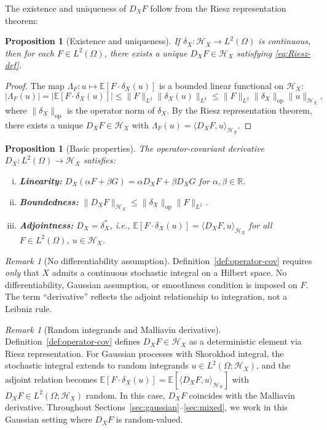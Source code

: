\documentclass[11pt,a4paper]{article}
\theoremstyle{plain}
\newtheorem{proposition}[theorem]{Proposition}
\theoremstyle{definition}
\theoremstyle{remark}
\newtheorem{remark}[theorem]{Remark}
\newcommand{\R}{\mathbb{R}}
\newcommand{\E}{\mathbb{E}}
\newcommand{\ip}[2]{\langle #1, #2 \rangle}
\newcommand{\norm}[1]{\| #1 \|}
\newcommand{\Lp}[1]{L^{#1}}
\newcommand{\HX}{\mathcal{H}_X}
\begin{document}
The existence and uniqueness of $D_X F$ follow from the Riesz representation theorem:

\begin{proposition}[Existence and uniqueness]\label{prop:riesz}
If $\delta_X: \HX \to \Lp{2}(\Omega)$ is continuous, then for each $F \in \Lp{2}(\Omega)$, there exists a unique $D_X F \in \HX$ satisfying \eqref{eq:Riesz-def}.
\end{proposition}

\begin{proof}
The map $\Lambda_F: u \mapsto \E[F \cdot \delta_X(u)]$ is a bounded linear functional on $\HX$:
\[
|\Lambda_F(u)| = |\E[F \cdot \delta_X(u)]| \leq \norm{F}_{\Lp{2}} \norm{\delta_X(u)}_{\Lp{2}} \leq \norm{F}_{\Lp{2}} \norm{\delta_X}_{\mathrm{op}} \norm{u}_{\HX},
\]
where $\norm{\delta_X}_{\mathrm{op}}$ is the operator norm of $\delta_X$. By the Riesz representation theorem, there exists a unique $D_X F \in \HX$ with $\Lambda_F(u) = \ip{D_X F}{u}_{\HX}$.
\end{proof}

\begin{proposition}[Basic properties]\label{prop:DX-props}
The operator-covariant derivative $D_X: \Lp{2}(\Omega) \to \HX$ satisfies:
\begin{enumerate}[(i)]
\item \textbf{Linearity:} $D_X(\alpha F + \beta G) = \alpha D_X F + \beta D_X G$ for $\alpha, \beta \in \R$.
\item \textbf{Boundedness:} $\norm{D_X F}_{\HX} \leq \norm{\delta_X}_{\mathrm{op}} \norm{F}_{\Lp{2}}$.
\item \textbf{Adjointness:} $D_X = \delta_X^*$, i.e., $\E[F \cdot \delta_X(u)] = \ip{D_X F}{u}_{\HX}$ for all $F \in \Lp{2}(\Omega)$, $u \in \HX$.
\end{enumerate}
\end{proposition}

\begin{remark}[No differentiability assumption]\label{rem:no-diff}
Definition~\ref{def:operator-cov} requires \emph{only} that $X$ admits a continuous stochastic integral on a Hilbert space. No differentiability, Gaussian assumption, or smoothness condition is imposed on $F$. The term ``derivative'' reflects the adjoint relationship to integration, not a Leibniz rule.
\end{remark}

\begin{remark}[Random integrands and Malliavin derivative]\label{rem:random-integrands}
Definition~\ref{def:operator-cov} defines $D_X F \in \HX$ as a deterministic element via Riesz representation. For Gaussian processes with Skorokhod integral, the stochastic integral extends to random integrands $u \in \Lp{2}(\Omega; \HX)$, and the adjoint relation becomes $\E[F \cdot \delta_X(u)] = \E[\ip{D_X F}{u}_{\HX}]$ with $D_X F \in \Lp{2}(\Omega; \HX)$ random. In this case, $D_X F$ coincides with the Malliavin derivative. Throughout Sections~\ref{sec:gaussian}--\ref{sec:mixed}, we work in this Gaussian setting where $D_X F$ is random-valued.
\end{remark}
\end{document}
